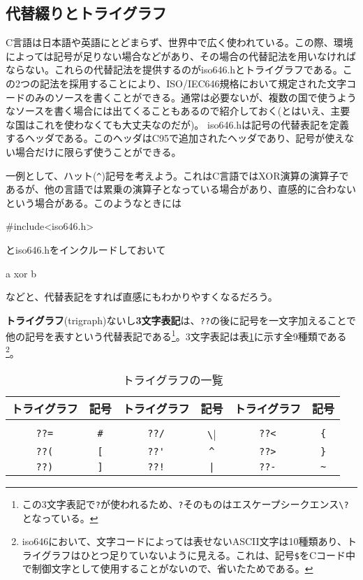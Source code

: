 \subsection{代替綴りとトライグラフ}
C言語は日本語や英語にとどまらず、世界中で広く使われている。この際、環境によっては記号が足りない場合などがあり、その場合の代替記法を用いなければならない。これらの代替記法を提供するのがiso646.hとトライグラフである。この2つの記法を採用することにより、ISO/IEC646規格において規定された文字コードのみのソースを書くことができる。通常は必要ないが、複数の国で使うようなソースを書く場合には出てくることもあるので紹介しておく(とはいえ、主要な国はこれを使わなくても大丈夫なのだが)。
iso646.hは記号の代替表記を定義するヘッダである。このヘッダはC95で追加されたヘッダであり、記号が使えない場合だけに限らず使うことができる。

一例として、ハット(\verb|^|)記号を考えよう。これはC言語ではXOR演算の演算子であるが、他の言語では累乗の演算子となっている場合があり、直感的に合わないという場合がある。このようなときには
\begin{code}
#include<iso646.h>
\end{code}
とiso646.hをインクルードしておいて
\begin{code}
a xor b
\end{code}
などと、代替表記をすれば直感にもわかりやすくなるだろう。

\textbf{トライグラフ}(trigraph)ないし\textbf{3文字表記}は、\verb|??|の後に記号を一文字加えることで他の記号を表すという代替表記である\footnote{この3文字表記で\verb|?|が使われるため、\verb|?|そのものはエスケープシークエンス\verb|\?|となっている。}。3文字表記は表\ref{trigraph}に示す全9種類である\footnote{iso646において、文字コードによっては表せないASCII文字は10種類あり、トライグラフはひとつ足りていないように見える。これは、記号\verb|$|をCコード中で制御文字として使用することがないので、省いたためである。}。
\begin{table}[htb]
\centering
\caption{トライグラフの一覧}\label{trigraph}
\begin{tabular}{|c|c||c|c||c|c|}\hline
トライグラフ&記号&トライグラフ&記号&トライグラフ&記号\\ \hline
& && && \\[-15.5pt] \hline
\verb|??=|&\verb|#|&\verb|??/|&\verb|\|&\verb|??<|&\verb|{|\\ \hline
\verb|??(|&\verb|[|&\verb|??'|&\verb|^|&\verb|??>|&\verb|}|\\ \hline
\verb|??)|&\verb|]|&\verb|??!|&\verb`|`&\verb|??-|&\verb|~|\\ \hline
\end{tabular}
\end{table}


